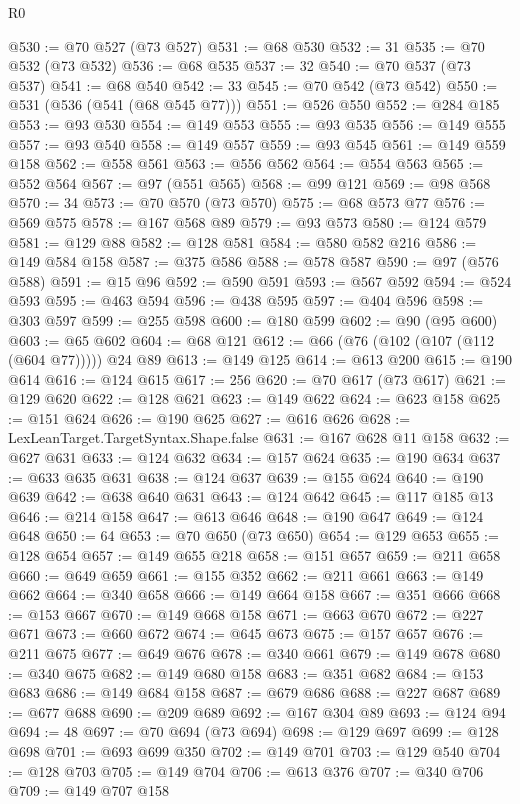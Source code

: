 \begin{lexlean}{R0}
\begin{coremodule}
@530 := @70 @527 (@73 @527)
@531 := @68 @530
@532 := 31
@535 := @70 @532 (@73 @532)
@536 := @68 @535
@537 := 32
@540 := @70 @537 (@73 @537)
@541 := @68 @540
@542 := 33
@545 := @70 @542 (@73 @542)
@550 := @531 (@536 (@541 (@68 @545 @77)))
@551 := @526 @550
@552 := @284 @185
@553 := @93 @530
@554 := @149 @553
@555 := @93 @535
@556 := @149 @555
@557 := @93 @540
@558 := @149 @557
@559 := @93 @545
@561 := @149 @559 @158
@562 := @558 @561
@563 := @556 @562
@564 := @554 @563
@565 := @552 @564
@567 := @97 (@551 @565)
@568 := @99 @121
@569 := @98 @568
@570 := 34
@573 := @70 @570 (@73 @570)
@575 := @68 @573 @77
@576 := @569 @575
@578 := @167 @568 @89
@579 := @93 @573
@580 := @124 @579
@581 := @129 @88
@582 := @128 @581
@584 := @580 @582 @216
@586 := @149 @584 @158
@587 := @375 @586
@588 := @578 @587
@590 := @97 (@576 @588)
@591 := @15 @96
@592 := @590 @591
@593 := @567 @592
@594 := @524 @593
@595 := @463 @594
@596 := @438 @595
@597 := @404 @596
@598 := @303 @597
@599 := @255 @598
@600 := @180 @599
@602 := @90 (@95 @600)
@603 := @65 @602
@604 := @68 @121
@612 := @66 (@76 (@102 (@107 (@112 (@604 @77))))) @24 @89
@613 := @149 @125
@614 := @613 @200
@615 := @190 @614
@616 := @124 @615
@617 := 256
@620 := @70 @617 (@73 @617)
@621 := @129 @620
@622 := @128 @621
@623 := @149 @622
@624 := @623 @158
@625 := @151 @624
@626 := @190 @625
@627 := @616 @626
@628 := LexLeanTarget.TargetSyntax.Shape.false
@631 := @167 @628 @11 @158
@632 := @627 @631
@633 := @124 @632
@634 := @157 @624
@635 := @190 @634
@637 := @633 @635 @631
@638 := @124 @637
@639 := @155 @624
@640 := @190 @639
@642 := @638 @640 @631
@643 := @124 @642
@645 := @117 @185 @13
@646 := @214 @158
@647 := @613 @646
@648 := @190 @647
@649 := @124 @648
@650 := 64
@653 := @70 @650 (@73 @650)
@654 := @129 @653
@655 := @128 @654
@657 := @149 @655 @218
@658 := @151 @657
@659 := @211 @658
@660 := @649 @659
@661 := @155 @352
@662 := @211 @661
@663 := @149 @662
@664 := @340 @658
@666 := @149 @664 @158
@667 := @351 @666
@668 := @153 @667
@670 := @149 @668 @158
@671 := @663 @670
@672 := @227 @671
@673 := @660 @672
@674 := @645 @673
@675 := @157 @657
@676 := @211 @675
@677 := @649 @676
@678 := @340 @661
@679 := @149 @678
@680 := @340 @675
@682 := @149 @680 @158
@683 := @351 @682
@684 := @153 @683
@686 := @149 @684 @158
@687 := @679 @686
@688 := @227 @687
@689 := @677 @688
@690 := @209 @689
@692 := @167 @304 @89
@693 := @124 @94
@694 := 48
@697 := @70 @694 (@73 @694)
@698 := @129 @697
@699 := @128 @698
@701 := @693 @699 @350
@702 := @149 @701
@703 := @129 @540
@704 := @128 @703
@705 := @149 @704
@706 := @613 @376
@707 := @340 @706
@709 := @149 @707 @158

\end{coremodule}
\end{lexlean}
